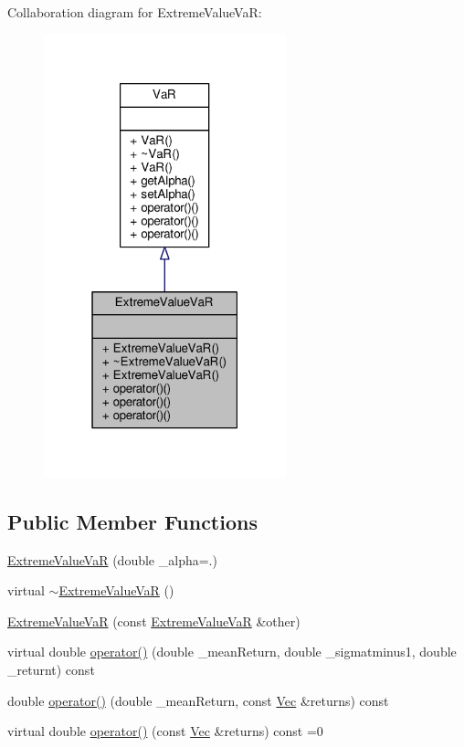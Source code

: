 Collaboration diagram for Extreme\+Value\+VaR\+:
\nopagebreak
\begin{figure}[H]
\begin{center}
\leavevmode
\includegraphics[width=199pt]{classExtremeValueVaR__coll__graph}
\end{center}
\end{figure}
\subsection*{Public Member Functions}
\begin{DoxyCompactItemize}
\item 
\hyperlink{classExtremeValueVaR_a0a85df72f4cd3d4e18b60e777e593c01}{Extreme\+Value\+VaR} (double \+\_\+alpha=.)
\item 
virtual \hyperlink{classExtremeValueVaR_a5079f1cf38bb19547f7d68695cf5e881}{$\sim$\+Extreme\+Value\+VaR} ()
\item 
\hyperlink{classExtremeValueVaR_a1c75fd9d6ec397b4b1ebc32225c4c41a}{Extreme\+Value\+VaR} (const \hyperlink{classExtremeValueVaR}{Extreme\+Value\+VaR} \&other)
\item 
virtual double \hyperlink{classExtremeValueVaR_ad6d31417001a3ee1b75592806d21ae8b}{operator()} (double \+\_\+mean\+Return, double \+\_\+sigmatminus1, double \+\_\+returnt) const
\item 
double \hyperlink{classExtremeValueVaR_a8dfe4d515f7e4d0260b3ac87c1a52b5f}{operator()} (double \+\_\+mean\+Return, const \hyperlink{compute__returns__eigen_8h_a1eb6a9306ef406d7975f3cbf2e247777}{Vec} \&returns) const
\item 
virtual double \hyperlink{classExtremeValueVaR_a3be021ee0faa2285bcb6be19815e3dc7}{operator()} (const \hyperlink{compute__returns__eigen_8h_a1eb6a9306ef406d7975f3cbf2e247777}{Vec} \&returns) const =0
\end{DoxyCompactItemize}


